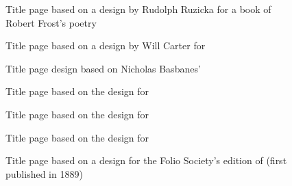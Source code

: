 \documentclass[10pt,a4paper,extrafontsizes]{memoir}
\begin{document}
\begin{figure}
\centering
\begin{showtitle}
\titleRF
\end{showtitle}
\caption{Title page based on a design by Rudolph Ruzicka for a book of Robert Frost's poetry} \label{fig:titleRF}
\end{figure}


\begin{figure}
\centering
\begin{showtitle}
\titleAM
\end{showtitle}
\caption{Title page based on a design by Will Carter for
} \label{fig:titleAM}
\end{figure}


\begin{figure}
\centering
\begin{showtitle}
\titlePM
\end{showtitle}
\caption{Title page design based on Nicholas Basbanes' } \label{fig:titlePM}
\end{figure}


\begin{figure}
\centering
\begin{showtitle}
\titleAT
\end{showtitle}
\caption{Title page based on the design for } \label{fig:titleAT}
\end{figure}


\begin{figure}
\centering
\begin{showtitle}
\titleLL
\end{showtitle}
\caption{Title page based on the design for } \label{fig:titleLL}
\end{figure}


\begin{figure}
\centering
\begin{showtitle}
\titleSW
\end{showtitle}
\caption{Title page based on the design for } \label{fig:titleSW}
\end{figure}


\begin{figure}
\centering
\begin{showtitle}
\titleTMB
\end{showtitle}
\caption{Title page based on a design for the Folio Society's edition of
   (first published in 1889)} \label{fig:titleTMB}
\end{figure}
\end{document}
